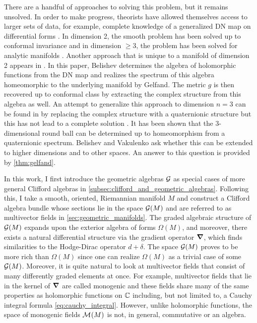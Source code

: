 There are a handful of approaches to solving this problem, but it remains unsolved. In order to make progress, theorists have allowed themselves access to larger sets of data, for example, complete knowledge of a generalized DN map on differential forms \cite{krupchyk_inverse_2011,sharafutdinov_complete_2013,belishev_dirichlet_2008,joshi_inverse_nodate}. In dimension 2, the smooth problem has been solved up to conformal invariance and in dimension $\geq 3$, the problem has been solved for analytic manifolds \cite{lassas_determining_2001}. Another approach that is unique to a manifold of dimension 2 appears in \cite{belishev_calderon_2003}. In this paper, Belishev determines the algebra of holomorphic functions from the DN map and realizes the spectrum of this algebra homeomorphic to the underlying manifold by Gelfand. The metric $g$ is then recovered up to conformal class by extracting the complex structure from this algebra as well. An attempt to generalize this approach to dimension $n=3$ can be found in by replacing the complex structure with a quaternionic structure but this has not lead to a complete solution \cite{belishev_algebras_2017, belishev_algebraic_2019}. It has been shown that the 3-dimensional round ball can be determined up to homeomorphism from a quaternionic spectrum. Belishev and Vakulenko ask whether this can be extended to higher dimensions and to other spaces. An answer to this question is provided by \cref{thm:gelfand}.

In this work, I first introduce the geometric algebras $\mathcal{G}$ as special cases of more general Clifford algebras in \cref{subsec:clifford_and_geometric_algebras}. Following this, I take a smooth, oriented, Riemannian manifold $M$ and construct a Clifford algebra bundle whose sections lie in the space $\mathcal{G}(M)$ and are referred to as multivector fields in \cref{sec:geometric_manifolds}. The graded algebraic structure of $\mathcal{G}(M)$ expands upon the exterior algebra of forms $\Omega(M)$, and moreover, there exists a natural differential structure via the gradient operator $\boldsymbol{\nabla}$, which finds similarities to the Hodge-Dirac operator $d+\delta$. The space $\mathcal{G}(M)$ proves to be more rich than $\Omega(M)$ since one can realize $\Omega(M)$ as a trivial case of some $\mathcal{G}(M)$. Moreover, it is quite natural to look at multivector fields that consist of many differently graded elements at once. For example, multivector fields that lie in the kernel of $\boldsymbol{\nabla}$ are called monogenic and these fields share many of the same properties as holomorphic functions on $\mathbb{C}$ including, but not limited to, a Cauchy integral formula \cref{eq:cauchy_integral}. However, unlike holomorphic functions, the space of monogenic fields $\mathcal{M}^{}(M)$ is not, in general, commutative or an algebra.

